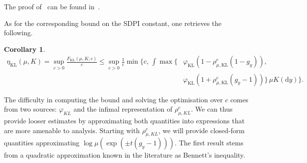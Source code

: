 \documentclass[11pt]{article}
\theoremstyle{plain}
\newtheorem{corollary}{Corollary}[section]
\theoremstyle{remark}
\begin{document}
The proof of~ can be found in~.

As for the corresponding bound on the SDPI constant, one retrieves the following.
\begin{corollary}\label{cor:klSDPIPolarGauge}
    \begin{align}
\eta_{\mathrm{KL}}(\mu,K) =  
    \sup_{c>0}
    \frac{
        F_{\mathrm{KL}}(\mu,K;c)
    }{c} 
\leq
\sup_{c>0}
\frac{1}{c}
\min\Bigg\{
c,\,
\int
\max\Bigg\{&
\varphi_{\mathrm{KL}}
\left(
1-\rho_{\mu,\mathrm{KL}}^c(1-g_y)
\right),
\nonumber\\
&
\varphi_{\mathrm{KL}}
\left(
1+\rho_{\mu,\mathrm{KL}}^c(g_y-1)
\right)
\Bigg\}
\,\mu K(\mathrm dy)
\Bigg\}.
\label{eq:klSDPIExactMGF}
\end{align}
\end{corollary}
The difficulty in computing the bound and solving the optimisation over $c$ comes from two sources: $\varphi_{KL}$ and the infimal representation of $\rho_{\mu,KL}^c$. We can thus provide looser estimates by approximating both quantities into expressions that are more amenable to analysis. 
Starting with $\rho_{\mu,KL}^c$, we will provide closed-form quantities approximating $\log \mu(\exp(\pm t(g_y-1)))$. The first result stems from a quadratic approximation known in the literature as Bennett's inequality.
\end{document}
